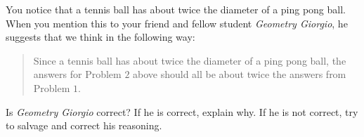 \documentclass[handout,noauthor,nooutcomes,hints]{ximera}
\begin{document}
\mynewpage

\begin{question}
  You notice that a tennis ball has about twice the diameter of a ping
  pong ball. When you mention this to your friend and fellow student
  \textit{Geometry Giorgio}, he suggests that we think in the
  following way:
\begin{quote}
  Since a tennis ball has about twice the diameter of a ping pong
  ball, the answers for Problem $2$ above should all be about twice the
  answers from Problem $1$.
\end{quote}
Is \textit{Geometry Giorgio} correct?  If he is correct, explain
why. If he is not correct, try to salvage and correct his reasoning.
\end{question}
\end{document}
